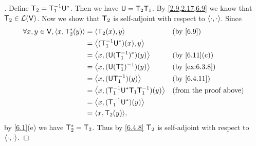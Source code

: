 \begin{proof}[]
  Define \(\mathsf{T}_2 = \mathsf{T}_1^{-1} \mathsf{U}^*\).
  Then we have \(\mathsf{U} = \mathsf{T}_2 \mathsf{T}_1\).
  By \cref{2.9,2.17,6.9} we know that \(\mathsf{T}_2 \in \mathcal{L}(\mathsf{V})\).
  Now we show that \(\mathsf{T}_2\) is self-adjoint with respect to \(\left\langle\cdot, \cdot\right\rangle\).
  Since
  \begin{align*}
    \forall x, y \in \V, \inn{x, \T_2^*(y)} & = \inn{\T_2(x), y}                            &  & \by{6.9}                      \\
                                            & = \inn{(\T_1^{-1} \U^*)(x), y}                                                   \\
                                            & = \inn{x, (\U (\T_1^{-1})^*)(y)}              &  & \by{6.11}[c]                  \\
                                            & = \inn{x, (\U (\T_1^*)^{-1})(y)}              &  & \by{ex:6.3.8}                 \\
                                            & = \inn{x, (\U \T_1^{-1})(y)}                  &  & \by{6.4.11}                   \\
                                            & = \inn{x, (\T_1^{-1} \U^* \T_1 \T_1^{-1})(y)} &  & \text{(from the proof above)} \\
                                            & = \inn{x, (\T_1^{-1} \U^*)(y)}                                                   \\
                                            & = \inn{x, \T_2(y)},
  \end{align*}
  by \cref{6.1}(e) we have \(\mathsf{T}_2^* = \mathsf{T}_2\).
  Thus by \cref{6.4.8} \(\mathsf{T}_2\) is self-adjoint with respect to \(\left\langle\cdot, \cdot\right\rangle\).


\end{proof}
